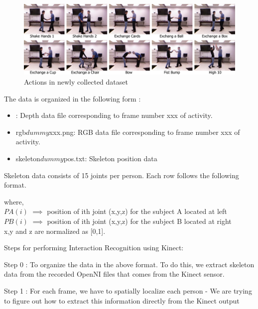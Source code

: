 \documentclass[10pt,twocolumn,letterpaper]{article}
\begin{document}
\begin{figure}[htb]
\begin{center}
\includegraphics[width=6.8in]{newactions.pdf}
\caption{Actions in newly collected dataset \label{fig:newactions}}
\end{center}
\end{figure}


The data is organized in the following form : 
\begin{itemize}
\item : Depth data file corresponding to frame number xxx of activity.
		
\item rgb$dummy$xxx.png: RGB data file corresponding to frame number xxx of activity.
				
\item skeleton$dummy$pos.txt: Skeleton position data

\end{itemize}
	
Skeleton data consists of 15 joints per person. Each row follows the following format.
\begin{equation*}
\end{equation*}	

where, \\
$PA(i)$ $\implies$ position of ith joint (x,y,z) for the subject A located at left \\
$PB(i)$ $\implies$ position of ith joint (x,y,z) for the subject B located at right \\
x,y and z are normalized as [0,1].	
\newline	



Steps for performing Interaction Recognition using Kinect:

Step 0 : To organize the data in the above format. To do this, we extract skeleton data from the recorded OpenNI files that comes from the Kinect sensor.

Step 1 : For each frame, we have to spatially localize each person - We are trying to figure out how to extract this information directly from the Kinect output
\end{document}
